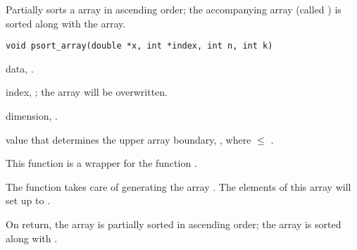 \documentclass[a4paper,oneside,10pt,DIV=12]{scrreprt}
\begin{document}
\begin{Description}
Partially sorts a  array in ascending order; the accompanying
 array (called ) is sorted along with the array.
\end{Description}
\begin{Usage}
\begin{verbatim}
void psort_array(double *x, int *index, int n, int k)
\end{verbatim}
\end{Usage}
\begin{Arguments}
	\begin{ldescription}
		\item[\code{x}] data, .
		\item[\code{index}] index, ; the array will be 
			overwritten. 
		\item[\code{n}] dimension, .
		\item[\code{k}]  value that determines the upper array 
			boundary, , where  $\leq$ .
	\end{ldescription}
\end{Arguments}
\begin{Details}
This function is a wrapper for the function 
.

The function takes care of generating the array . The elements of
this array will set up to . 
\end{Details}
\begin{Value}
	On return, the array  is partially sorted in ascending order;
	the array  is sorted along with .
\end{Value}
\end{document}
